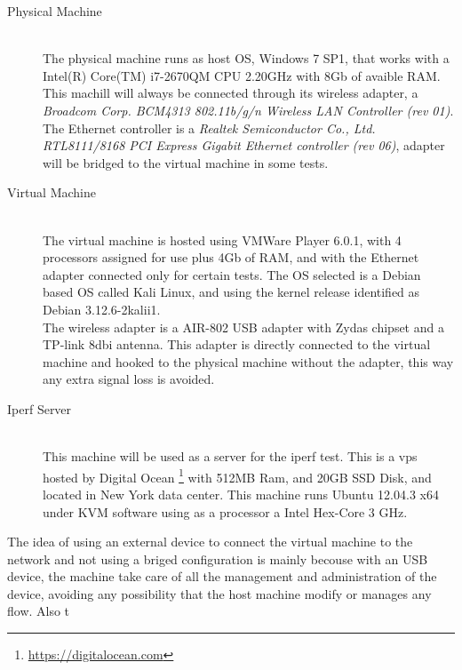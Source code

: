 \begin{description}

\item [Physical Machine] \hfill \\
The physical machine runs as host OS, Windows 7 SP1, that works with a Intel(R)
Core(TM) i7-2670QM CPU \@ 2.20GHz with 8Gb of avaible RAM. This machill will 
always be connected through its wireless adapter, a \textit{Broadcom Corp. 
BCM4313 802.11b/g/n Wireless LAN Controller (rev 01)}. The Ethernet controller 
is a \textit{Realtek Semiconductor Co., Ltd. RTL8111/8168 PCI Express Gigabit 
Ethernet controller (rev 06)}, adapter will be bridged to the virtual 
machine in some tests.\\

\item[Virtual Machine] \hfill \\
The virtual machine is hosted using VMWare Player 6.0.1, with 4 processors 
assigned for use plus 4Gb of RAM, and with the Ethernet adapter connected only
for certain tests. The OS selected is a Debian based OS called Kali Linux, and
using the kernel release identified as Debian 3.12.6-2kalii1.\\

The wireless adapter is a AIR-802 USB adapter with Zydas chipset and a TP-link 
8dbi antenna. This adapter is directly connected to the virtual machine and 
hooked to the physical machine without the adapter, this way any extra signal 
loss is avoided. \\

\item[Iperf Server] \hfill \\
This machine will be used as a server for the iperf test. This is a vps hosted 
by Digital Ocean \footnote{\url{https://digitalocean.com}} with 512MB Ram, and 
20GB SSD Disk, and located in New York data center. This machine runs Ubuntu 
12.04.3 x64 under KVM software using as a processor a Intel Hex-Core 3 GHz.

\end{description}

The idea of using an external device to connect the virtual machine to the 
network and not using a briged configuration is mainly becouse with an USB 
device, the machine take care of all the management and administration of the 
device, avoiding any possibility that the host machine modify or manages any 
flow. Also t

